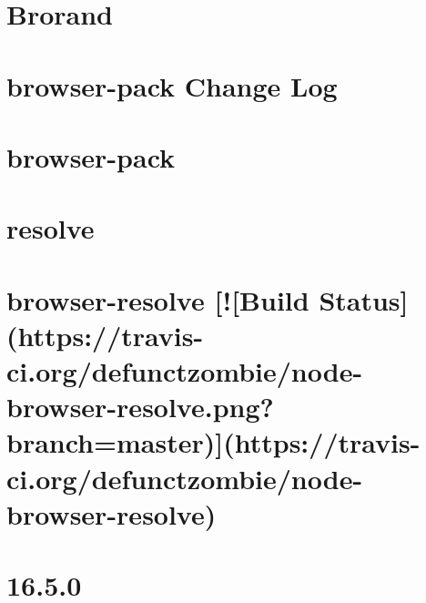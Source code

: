 \documentclass[twoside]{book}
\newcommand{\+}{\discretionary{\mbox{\scriptsize$\hookleftarrow$}}{}{}}
\begin{document}
\chapter{Brorand}
\label{md_dsmacc_examples_DRmerge_node_modules_brorand_README}

\chapter{browser-\/pack Change Log}
\label{md_dsmacc_examples_DRmerge_node_modules_browser-pack_CHANGELOG}

\chapter{browser-\/pack}
\label{md_dsmacc_examples_DRmerge_node_modules_browser-pack_readme}

\chapter{resolve}
\label{md_dsmacc_examples_DRmerge_node_modules_browser-resolve_node_modules_resolve_readme}

\chapter{browser-\/resolve \mbox{[}!\mbox{[}Build Status\mbox{]}(https\+://travis-\/ci.org/defunctzombie/node-\/browser-\/resolve.png?branch=master)\mbox{]}(https\+://travis-\/ci.org/defunctzombie/node-\/browser-\/resolve)}
\label{md_dsmacc_examples_DRmerge_node_modules_browser-resolve_README}

\chapter{16.5.0}
\label{md_dsmacc_examples_DRmerge_node_modules_browserify_changelog}

\end{document}
